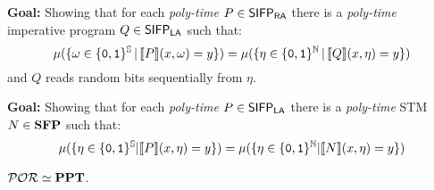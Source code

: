 \documentclass[xcolor={x11names}]{beamer}
\begin{document}
\begin{frame}
\begin{overprint}
  \medskip

  \textbf{Goal: } Showing that for each \emph{poly-time} $P \in \mathsf{SIFP_{{\mathsf{RA}}}}$ there is a \emph{poly-time} imperative program $Q\in \mathsf{SIFP_{{\mathsf{LA}}}}$ such that:
  $$
  \mu(\{\omega\in \{\mathtt{0}, \mathtt{1}\}^{\mathbb{S}}\,|\, \llbracket P\rrbracket (x, \omega)=y\})= \mu(\{\eta\in \{\mathtt{0}, \mathtt{1}\}^{\mathbb{N}}\,|\, \llbracket Q\rrbracket(x, \eta)=y\})
  $$
  and $Q$ reads random bits sequentially from $\eta$.

  \medskip


\medskip

\textbf{Goal: } Showing that for each \emph{poly-time} $P \in \mathsf{SIFP_{{\mathsf{LA}}}}$ there is a \emph{poly-time} STM $N\in \mathbf{SFP}$ such that:
  $$
  \mu(\{\eta\in \{\mathtt{0}, \mathtt{1}\}^{\mathbb{S}}| \llbracket P\rrbracket (x, \eta)=y\})= \mu(\{\eta\in \{\mathtt{0}, \mathtt{1}\}^{\mathbb{N}}| \llbracket N\rrbracket(x, \eta)=y\})
  $$

  \begin{theorem}
    $\mathcal{POR} \simeq \mathbf{PPT}$.
  \end{theorem}
\end{overprint}

\end{frame}
\end{document}
